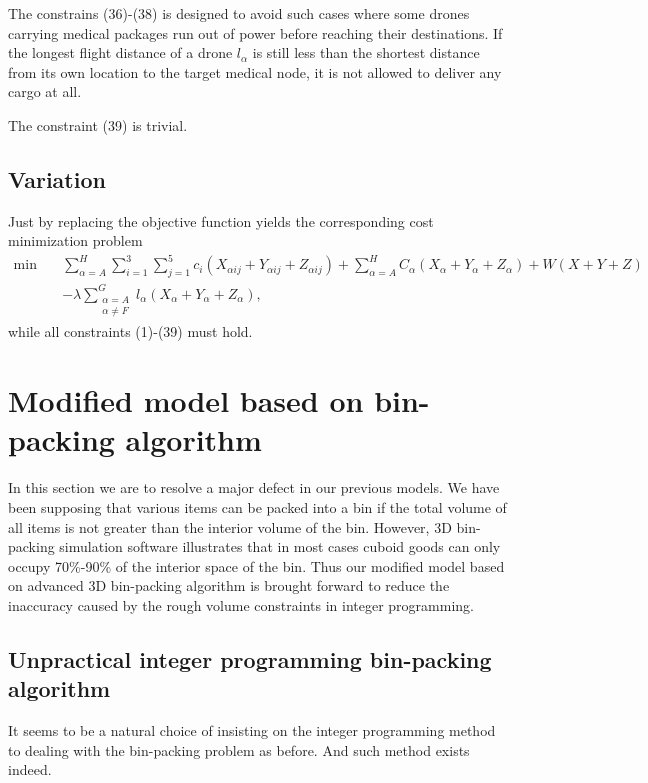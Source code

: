 \documentclass{mcmthesis}
\begin{document}
\noindent The constrains (36)-(38) is designed to avoid such cases where some drones carrying medical packages run out of power before reaching their destinations. If the longest flight distance of a drone $l_{\alpha}$ is still less than the shortest distance from its own location to the target medical node, it is not allowed to deliver any cargo at all.

\noindent The constraint (39) is trivial.
\subsection{Variation}
Just by replacing the objective function yields the corresponding cost minimization problem
\[
\begin{aligned}
\min\quad&\sum_{\alpha=A}^{H}\sum_{i=1}^{3}\sum_{j=1}^{5}c_{i}\left(X_{\alpha ij}+Y_{\alpha ij}+Z_{\alpha ij}\right)
+\sum_{\alpha=A}^{H}C_{{\alpha}}\left(X_{\alpha}+Y_{\alpha }+Z_{\alpha }\right)+W(X+Y+Z)\\
&-\lambda\sum_{\substack{\alpha=A\\ \alpha\ne F}}^{G}l_\alpha (X_\alpha+Y_\alpha+Z_\alpha),
\end{aligned}
\]
while all constraints (1)-(39) must hold.


\section{Modified model based on bin-packing algorithm}

In this section we are to resolve a major defect in our previous models. We have been supposing that various items can be packed into a bin if the total volume of all items is not greater than the interior volume of the bin. However, 3D bin-packing simulation software illustrates that in most cases cuboid goods can only occupy 70\%-90\% of the interior space of the bin. Thus our modified model based on advanced 3D bin-packing algorithm is brought forward to reduce the inaccuracy caused by the rough volume constraints in integer programming.


\subsection{Unpractical integer programming bin-packing algorithm}
It seems to be a natural choice of insisting on the integer programming method to dealing with the bin-packing problem as before. And such method exists indeed.
\end{document}
